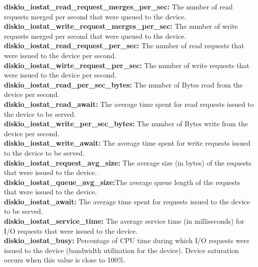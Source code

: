 \documentclass{iosart2c}
\begin{document}
\textbf{diskio\_iostat\_read\_request\_merges\_per\_sec:} The number of read requests merged per second that were queued to the device.\\

\textbf{diskio\_iostat\_write\_request\_merges\_per\_sec:} The number of write requests merged per second that were queued to the device.\\

\textbf{diskio\_iostat\_read\_request\_per\_sec:} The number of read requests that were issued to the device per second.\\

\textbf{diskio\_iostat\_wirte\_request\_per\_sec:} The number of write requests that were issued to the device per second.\\

\textbf{diskio\_iostat\_read\_per\_sec\_bytes:} The number of Bytes read from the device per second.\\

\textbf{diskio\_iostat\_read\_await:} The average time spent for read requests issued to the device to be served.\\

\textbf{diskio\_iostat\_write\_per\_sec\_bytes:}  The number of Bytes write from the device per second.\\

\textbf{diskio\_iostat\_write\_await:} The average time spent for write requests issued to the device to be served.\\

\textbf{diskio\_iostat\_request\_avg\_size:} The average size (in bytes) of the requests that were issued to the device.\\

\textbf{diskio\_iostat\_queue\_avg\_size:}The average queue length of the requests that were issued to the device.\\

\textbf{diskio\_iostat\_await:} The average time spent for requests issued to the device to be served.\\

\textbf{diskio\_iostat\_service\_time:} The average service time (in milliseconds) for I/O requests that were issued to the device.\\

\textbf{diskio\_iostat\_busy:} Percentage of CPU time during which I/O requests were issued to the device (bandwidth utilization for the device). Device saturation occurs when this value is close to 100\%.\\
\end{document}
